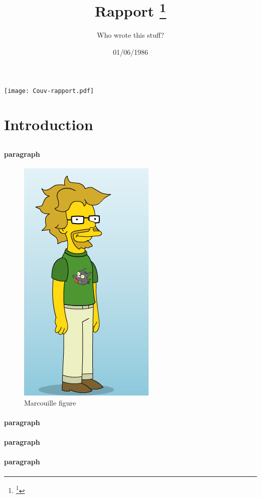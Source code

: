 \documentclass{article}
\title{Rapport
	\footnote{\thanks{A special form of footnote}}}
\author{Who wrote this stuff?}
\date{01/06/1986}
\begin{document}
\texttt{[image: Couv-rapport.pdf]}

\pagebreak



\listoffigures  %
\pagebreak
\listoftables   %
\pagebreak
\tableofcontents{}
\pagebreak

\section{Introduction}
\subsection{}
\paragraph{paragraph}
\begin{figure}[htp]
\centering
\includegraphics{marcouille.png}
\caption{Marcouille figure}\label{fig:marcouille.png}
\end{figure}
\paragraph{paragraph}
\paragraph{paragraph}
\paragraph{paragraph}
\end{document}
